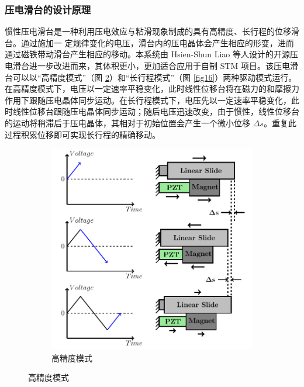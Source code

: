 \documentclass[zihao=-4]{ctexart}
\begin{document}
\begin{spacing}{1.5}
			
		
				
				
		
		
		\subsubsection{压电滑台的设计原理}
			惯性压电滑台是一种利用压电效应与粘滑现象制成的具有高精度、长行程的位移滑台。通过施加一
			定规律变化的电压，滑台内的压电晶体会产生相应的形变，进而通过磁铁带动滑台产生相应的移动。本系统由 Hsien-Shun Liao 等人设计的开源压电滑台\cite{ref18}进一步改进而来，其体积更小，更加适合应用于自制 STM 项目。该压电滑台可以以“高精度模式”（图 \ref{fig15}）和“长行程模式”（图 \ref{fig16}）两种驱动模式运行。在高精度模式下，电压以一定速率平稳变化，此时线性位移台将在磁力的和摩擦力作用下跟随压电晶体同步运动。在长行程模式下，电压先以一定速率平稳变化，此时线性位移台跟随压电晶体同步运动；随后电压迅速改变，由于惯性，线性位移台的运动将稍滞后于压电晶体，其相对于初始位置会产生一个微小位移 $\Delta s$。重复此过程积累位移即可实现长行程的精确移动。
			\begin{figure}[htbp]
				\centering
				\begin{subfigure}{0.49\linewidth}
					\centering
					\includegraphics[width=\textwidth]{tex/fig1/fig1.pdf}
					\caption{高精度模式}
					\label{fig15}
				\end{subfigure}

\end{figure}
\end{spacing}
\end{document}
